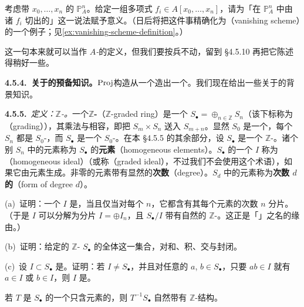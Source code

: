 \begin{exercise}\label{ex:cut-out-by-forms}
考虑带\trProjective\trCoordinate{} $x_0,\dots,x_n$ 的 $\mathbb{P}^n_A$。给定一组\trHomogeneous{}多项式 $f_i\in A[x_0,\dots,x_n]$，请为「在 $\mathbb{P}^n_A$ 中由诸 $f_i$ 切出的\trScheme」这一说法赋予意义。（日后将把这件事精确化为\trVanishingScheme（vanishing scheme）的一个例子；见\cref{ex:vanishing-scheme-definition}。）
\end{exercise}

这一句本来就可以当作\emph{\trProjective{} $A$-\trScheme}的定义，但我们要按兵不动，留到 \S4.5.10 再把它陈述得稍好一些。

\textbf{4.5.4.\ 关于\trGradedRing{}的预备知识。}\quad $\operatorname{Proj}$构造从一个\trGradedRing{}造出一个\trScheme。我们现在给出一些关于\trGradedRing{}的背景知识。

\textbf{4.5.5.}\ \emph{定义：$\mathbb{Z}$-\trGradedRing。}\quad 一个\textbf{$\mathbb{Z}$-\trGradedRing}（$\mathbb{Z}$-graded ring）是一个\trRing{} $S_\bullet=\oplus_{n\in\mathbb{Z}}S_n$（该下标称为\textbf{\trGrading}（grading）），其乘法与\trGrading{}相容，即把 $S_m\times S_n$ 送入 $S_{m+n}$。显然 $S_0$ 是一个\trSubring，每个 $S_n$ 都是 $S_0$-\trModule，而 $S_\bullet$ 是一个 $S_0$-\trAlgebra。在本 \S4.5.5 的其余部分，设 $S_\bullet$ 是一个 $\mathbb{Z}$-\trGradedRing。诸个别 $S_n$ 中的元素称为 $S_\bullet$ 的\textbf{\trHomogeneous{}元素}（homogeneous elements）。$S_\bullet$ 的一个\trIdeal{} $I$ 称为\textbf{\trHomogeneous\trIdeal}（homogeneous ideal）（或称\trGradedIdeal{}（graded ideal），不过我们不会使用这个术语），如果它由\trHomogeneous{}元素生成。非零的\trHomogeneous{}元素带有显然的\textbf{次数}（degree）。$S_d$ 中的元素称为\textbf{次数 $d$ 的\trForm}（form of degree $d$）。

\begin{exercise}\label{ex:homogeneous-ideal-basics}
(a)~证明：一个\trIdeal{} $I$ 是\trHomogeneous\trIdeal，当且仅当对每个 $n$，它都含有其每个元素的次数 $n$ 分片。（于是 $I$ 可以分解为\trHomogeneous{}分片 $I=\oplus I_n$，且 $S_\bullet/I$ 带有自然的 $\mathbb{Z}$-\trGrading。这正是「\trHomogeneous\trIdeal」之名的缘由。）

(b)~证明：给定的 $\mathbb{Z}$-\trGradedRing{} $S_\bullet$ 的全体\trHomogeneous\trIdeal{}这一集合，对和、积、交与\trRadical{}封闭。

(c)~设 $I\subset S_\bullet$ 是\trHomogeneous\trIdeal。证明：若 $I\neq S_\bullet$，并且对任意\trHomogeneous{}的 $a$, $b\in S_\bullet$，只要 $ab\in I$ 就有 $a\in I$ 或 $b\in I$，则 $I$ 是\trPrimeIdeal。

若 $T$ 是 $S_\bullet$ 的一个只含\trHomogeneous{}元素的\trMultiplicativeSubset，则 $T^{-1}S_\bullet$ 自然带有 $\mathbb{Z}$-\trGradedRing{}结构。
\end{exercise}

